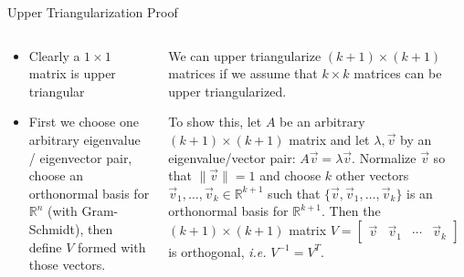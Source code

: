 \begin{frame}{Upper Triangularization Proof}

\begin{columns}[T] %
\begin{column}{.38\textwidth}
%
    \begin{itemize}
        \item Clearly a \(1 \times 1\) matrix is upper triangular
        \item 
            First we choose one arbitrary eigenvalue / eigenvector pair, choose an orthonormal basis for \(\mathbb R^n\) (with Gram-Schmidt), then define \(V\) formed with those vectors.
    \end{itemize}

\end{column}%
\hfill%
\begin{column}{.66\textwidth}
    We can upper triangularize \((k+1) \times (k+1)\) matrices if we assume that \(k \times k\) matrices can be upper triangularized.

    To show this, let \(A\) be an arbitrary \((k+1) \times (k + 1)\) matrix and let \(\lambda, \vec v\) by an eigenvalue/vector pair: \(A \vec v = \lambda \vec v\).
    Normalize \(\vec v\) so that \(\lVert \vec v \rVert = 1\) and choose \(k\) other vectors \(\vec v_1, \ldots, \vec v_k \in \mathbb R^{k+1}\) such that \(\{\vec v, \vec v_1, \ldots, \vec v_k\}\) is an orthonormal basis for \(\mathbb R^{k+1}\). Then the \((k+1) \times (k+1)\) matrix \(V = \begin{bmatrix} \vec v & \vec v_1 & \cdots  &\vec v_k \end{bmatrix}\) is orthogonal, \emph{i.e.} 
        \( V^{-1} = V^T
        \).



\end{column}%
\end{columns}


\end{frame}
